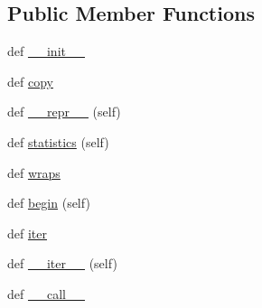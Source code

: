 \subsection*{Public Member Functions}
\begin{DoxyCompactItemize}
\item 
def \hyperlink{classpip_1_1__vendor_1_1tenacity_1_1BaseRetrying_abe45da6852609c52fa8f89156fc96af2}{\+\_\+\+\_\+init\+\_\+\+\_\+}
\item 
def \hyperlink{classpip_1_1__vendor_1_1tenacity_1_1BaseRetrying_ad20e75611b8217d93b89816ffdeff095}{copy}
\item 
def \hyperlink{classpip_1_1__vendor_1_1tenacity_1_1BaseRetrying_a0b63c7a6b07b376bc891e472375b063f}{\+\_\+\+\_\+repr\+\_\+\+\_\+} (self)
\item 
def \hyperlink{classpip_1_1__vendor_1_1tenacity_1_1BaseRetrying_ac2f7391ae165bddfb8a6e796693f7a39}{statistics} (self)
\item 
def \hyperlink{classpip_1_1__vendor_1_1tenacity_1_1BaseRetrying_a2bd862a3771b5ae08f129f5ca6c749be}{wraps}
\item 
def \hyperlink{classpip_1_1__vendor_1_1tenacity_1_1BaseRetrying_a8d329169c9b24288beb54a893741b3c5}{begin} (self)
\item 
def \hyperlink{classpip_1_1__vendor_1_1tenacity_1_1BaseRetrying_a39f731ec49b96f47e554cf877426a25b}{iter}
\item 
def \hyperlink{classpip_1_1__vendor_1_1tenacity_1_1BaseRetrying_a4f7a248f329420758aa55e05b09bb483}{\+\_\+\+\_\+iter\+\_\+\+\_\+} (self)
\item 
def \hyperlink{classpip_1_1__vendor_1_1tenacity_1_1BaseRetrying_aa351013671a0d89d8f9742403ca26008}{\+\_\+\+\_\+call\+\_\+\+\_\+}
\end{DoxyCompactItemize}
